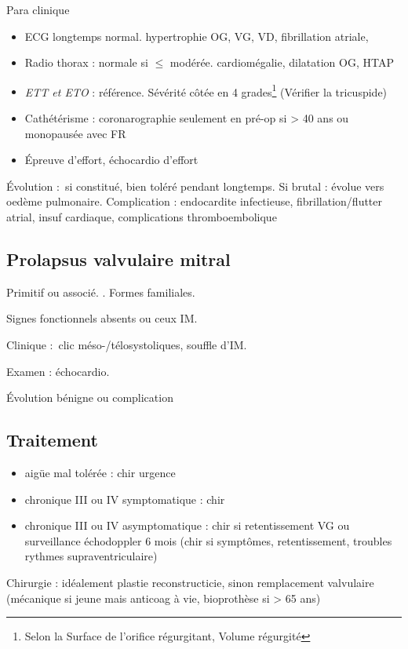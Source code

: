 \documentclass{article}
\begin{document}
Para clinique
\begin{itemize}
  \item ECG longtemps normal. hypertrophie OG, VG, VD, fibrillation atriale, 
  \item Radio thorax : normale si $\le$ modérée. cardiomégalie, dilatation OG,
    HTAP
  \item \textit{ETT et ETO} : référence. Sévérité côtée en 4 grades\footnote{Selon
      la Surface de l'orifice régurgitant, Volume régurgité} (Vérifier la
    tricuspide)
  \item Cathétérisme : coronarographie seulement en pré-op si \male > 40 ans ou
    \female{} monopausée avec FR
  \item Épreuve d'effort, échocardio d'effort
\end{itemize}

Évolution : si constitué, bien toléré pendant longtemps. Si brutal : évolue vers
oedème pulmonaire. Complication : endocardite infectieuse, fibrillation/flutter
atrial, insuf cardiaque, complications thromboembolique

\subsection{Prolapsus valvulaire mitral}
Primitif ou associé. \female. Formes familiales.

Signes fonctionnels absents ou ceux IM.

Clinique : clic méso-/télosystoliques, souffle d'IM.

Examen : échocardio.

Évolution bénigne ou complication

\subsection{Traitement}
\begin{itemize}
  \item aigüe mal tolérée : chir urgence 
  \item chronique III ou IV symptomatique : chir
  \item chronique III ou IV asymptomatique : chir si retentissement VG ou
    surveillance échodoppler 6 mois (chir si symptômes, retentissement, troubles
    rythmes supraventriculaire)
\end{itemize}

Chirurgie : idéalement plastie reconstructicie, sinon remplacement valvulaire
(mécanique si jeune mais anticoag à vie, bioprothèse si > 65 ans)
\end{document}
